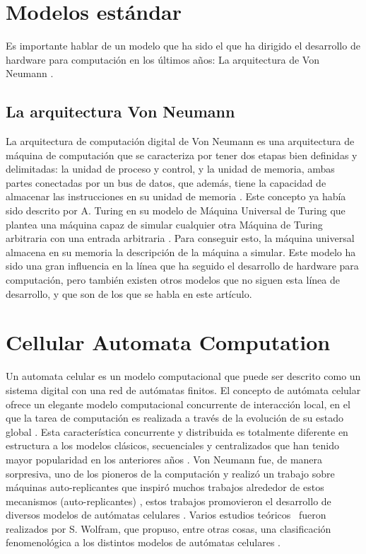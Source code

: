 \documentclass[conference]{IEEEtran}
\begin{document}
\section{Modelos estándar}
Es importante hablar de un modelo que ha sido el que ha dirigido el desarrollo de hardware para computación en los últimos años: La arquitectura de Von Neumann \cite{poznanovic2006}.

\subsection{La arquitectura Von Neumann}
La arquitectura de computación digital de Von Neumann es una arquitectura de máquina de computación que se caracteriza por tener dos etapas bien definidas y delimitadas: la unidad de proceso y control, y la unidad de memoria, ambas partes conectadas por un bus de datos, que además, tiene la capacidad de almacenar las instrucciones en su unidad de memoria \cite{poznanovic2006} \cite{neumann1945}. Este concepto ya había sido descrito por A. Turing en su modelo de Máquina Universal de Turing que plantea una máquina capaz de simular cualquier otra Máquina de Turing arbitraria con una entrada arbitraria \cite{turing2009computing}\cite{eberbach2004turing} \cite{aspray1990john}. Para conseguir esto, la máquina universal almacena en su memoria la descripción de la máquina a simular.
Este modelo ha sido una gran influencia en la línea que ha seguido el desarrollo de hardware para computación, pero también existen otros modelos que no siguen esta línea de desarrollo, y que son de los que se habla en este artículo.

\section{Cellular Automata Computation}
Un automata celular es un modelo computacional que puede ser descrito como un sistema digital con una red de autómatas finitos. El concepto de autómata celular ofrece un elegante modelo computacional concurrente de interacción local, en el que la tarea de computación es realizada a través de la evolución de su estado global \cite{dascalu2016cellular}. Esta característica concurrente y distribuida es totalmente diferente en estructura a los modelos clásicos, secuenciales y centralizados que han tenido mayor popularidad en los anteriores años \cite{poznanovic2006}. Von Neumann fue, de manera sorpresiva, uno de los pioneros de la computación y realizó un trabajo sobre máquinas auto-replicantes que inspiró muchos trabajos alrededor de estos mecanismos (auto-replicantes) \cite{poznanovic2006} \cite{chou1998self} \cite{aspray1990john}, estos trabajos promovieron el desarrollo de diversos modelos de autómatas celulares \cite{poznanovic2006}. Varios estudios teóricos  fueron realizados por S. Wolfram, que propuso, entre otras cosas, una clasificación fenomenológica a los distintos modelos de autómatas celulares \cite{wolfram2018}.
\end{document}
